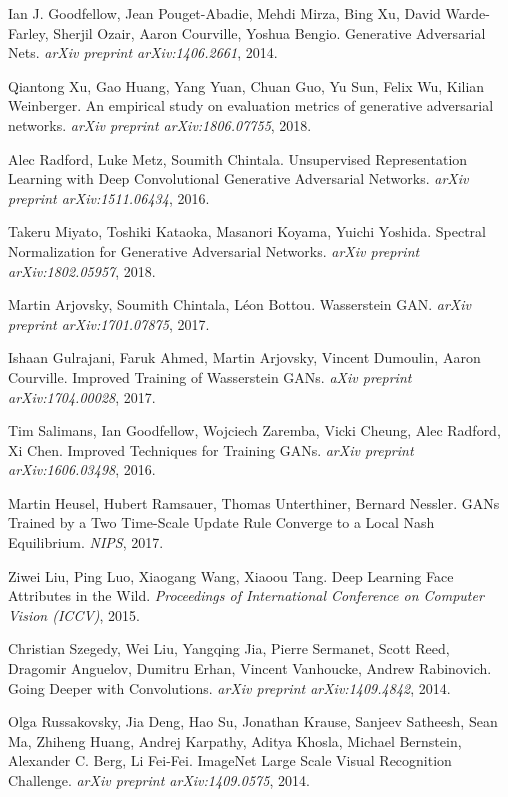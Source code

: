 \documentclass[12pt, a4paper]{article}
\begin{document}
\newpage
\begin{thebibliography}{9}
	Ian J. Goodfellow, Jean Pouget-Abadie, Mehdi Mirza, Bing Xu, David Warde-Farley, Sherjil Ozair, Aaron Courville, Yoshua Bengio. Generative Adversarial Nets. \textit{arXiv preprint arXiv:1406.2661}, 2014.
	
	Qiantong Xu, Gao Huang, Yang Yuan, Chuan Guo, Yu Sun, Felix Wu, Kilian Weinberger. An empirical study on evaluation metrics of generative adversarial networks. \textit{arXiv preprint arXiv:1806.07755}, 2018.
	
	Alec Radford, Luke Metz, Soumith Chintala. Unsupervised Representation Learning with Deep Convolutional Generative Adversarial Networks. \textit{arXiv preprint arXiv:1511.06434}, 2016.
	
	Takeru Miyato, Toshiki Kataoka, Masanori Koyama, Yuichi Yoshida. Spectral Normalization for Generative Adversarial Networks. \textit{arXiv preprint arXiv:1802.05957}, 2018.
	
	Martin Arjovsky, Soumith Chintala, Léon Bottou. Wasserstein GAN. \textit{arXiv preprint arXiv:1701.07875}, 2017.
	
	Ishaan Gulrajani, Faruk Ahmed, Martin Arjovsky, Vincent Dumoulin, Aaron Courville. Improved Training of Wasserstein GANs. \textit{aXiv preprint arXiv:1704.00028}, 2017.
	
	Tim Salimans, Ian Goodfellow, Wojciech Zaremba, Vicki Cheung, Alec Radford, Xi Chen. Improved Techniques for Training GANs. \textit{arXiv preprint arXiv:1606.03498}, 2016.
	
	Martin Heusel, Hubert Ramsauer, Thomas Unterthiner, Bernard Nessler. GANs Trained by a Two Time-Scale Update Rule
	Converge to a Local Nash Equilibrium. \textit{NIPS}, 2017.
	
	Ziwei Liu, Ping Luo, Xiaogang Wang, Xiaoou Tang. Deep Learning Face Attributes in the Wild. \textit{Proceedings of International Conference on Computer Vision (ICCV)}, 2015.
	
	Christian Szegedy, Wei Liu, Yangqing Jia, Pierre Sermanet, Scott Reed, Dragomir Anguelov, Dumitru Erhan, Vincent Vanhoucke, Andrew Rabinovich. Going Deeper with Convolutions. \textit{arXiv preprint arXiv:1409.4842}, 2014.
	
	Olga Russakovsky, Jia Deng, Hao Su, Jonathan Krause, Sanjeev Satheesh, Sean Ma, Zhiheng Huang, Andrej Karpathy, Aditya Khosla, Michael Bernstein, Alexander C. Berg, Li Fei-Fei. ImageNet Large Scale Visual Recognition Challenge. \textit{arXiv preprint arXiv:1409.0575}, 2014.
	

\end{thebibliography}
\end{document}
